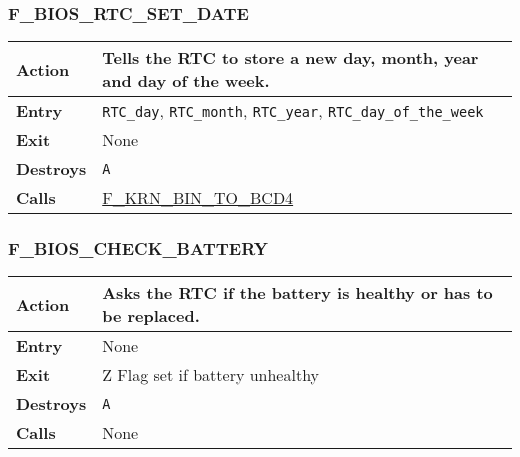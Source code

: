         \subsubsection{F\_BIOS\_RTC\_SET\_DATE}
        \label{func:fbiosrtcsetdate}
        \begin{tabular}{l p{15cm}}
            \hline\textbf{Action}
            & Tells the \textbf{RTC} to store a new day, month, year and day of
            the week. \\
            \hline\textbf{Entry} & \texttt{RTC\_day}, \texttt{RTC\_month},
            \texttt{RTC\_year}, \texttt{RTC\_day\_of\_the\_week} \\
            \hline\textbf{Exit} & None\\
            \hline\textbf{Destroys} & \texttt{A} \\
            \hline\textbf{Calls}
            & \hyperref[func:fkrnbintobcd4]{F\_KRN\_BIN\_TO\_BCD4}\\
            \hline
        \end{tabular}

        \subsubsection{F\_BIOS\_CHECK\_BATTERY}
        \label{func:fbiosrtccheckbattery}
        \begin{tabular}{l p{15cm}}
            \hline\textbf{Action}
            & Asks the \textbf{RTC} if the battery is healthy or has to be
            replaced. \\
            \hline\textbf{Entry} & None\\
            \hline\textbf{Exit} & Z Flag set if battery unhealthy\\
            \hline\textbf{Destroys} & \texttt{A} \\
            \hline\textbf{Calls} & None\\
            \hline
        \end{tabular}
